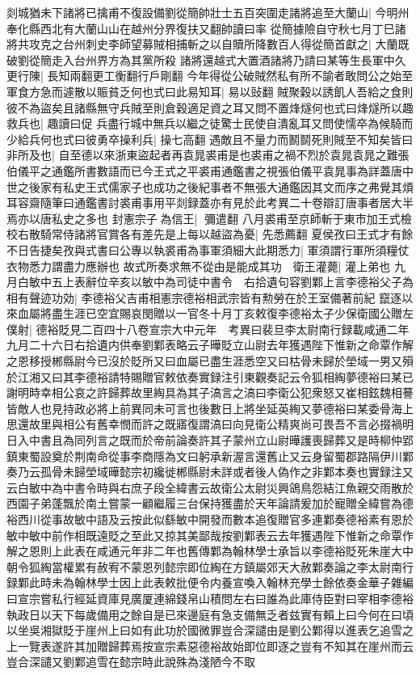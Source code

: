 剡城猶未下諸將已擒甫不復設備劉從簡帥壯士五百突圍走諸將追至大蘭山|{
	今明州奉化縣西北有大蘭山山在越州分界復扶又翻帥讀曰率}
從簡據險自守秋七月丁巳諸將共攻克之台州刺史李師望募賊相捕斬之以自贖所降數百人得從簡首獻之|{
	大蘭既破劉從簡走入台州界方為其黨所殺}
諸將還越式大置酒諸將乃請曰某等生長軍中久更行陳|{
	長知兩翻更工衡翻行戶剛翻}
今年得從公破賊然私有所不諭者敢問公之始至軍食方急而遽散以賑貧乏何也式曰此易知耳|{
	易以䜴翻}
賊聚穀以誘飢人吾給之食則彼不為盜矣且諸縣無守兵賊至則倉穀適足資之耳又問不置烽燧何也式曰烽燧所以趣救兵也|{
	趣讀曰促}
兵盡行城中無兵以繼之徒驚士民使自潰亂耳又問使懦卒為候騎而少給兵何也式曰彼勇卒操利兵|{
	操七高翻}
遇敵且不量力而鬭鬬死則賊至不知矣皆曰非所及也|{
	自至德以來浙東盜起者再袁晁裘甫是也裘甫之禍不烈於袁晁袁晁之難張伯儀平之通鑑所書數語而已今王式之平裘甫通鑑書之視張伯儀平袁晁事為詳蓋唐中世之後家有私史王式儒家子也成功之後紀事者不無張大通鑑因其文而序之弗覺其煩耳容齋隨筆曰通鑑書討裘甫事用平剡録蓋亦有見於此考異二十卷辯訂唐事者居大半焉亦以唐私史之多也}
封憲宗子為信王|{
	彌遣翻}
八月裘甫至京師斬于東市加王式檢校右散騎常侍諸將官賞各有差先是上每以越盜為憂|{
	先悉薦翻}
夏侯孜曰王式才有餘不日告捷矣孜與式書曰公專以執裘甫為事軍須細大此期悉力|{
	軍須謂行軍所須糧仗衣物悉力謂盡力應辦也}
故式所奏求無不從由是能成其功　衛王灌薨|{
	灌上弟也}
九月白敏中五上表辭位辛亥以敏中為司徒中書令　右拾遺句容劉鄴上言李德裕父子為相有聲迹功効|{
	李德裕父吉甫相憲宗德裕相武宗皆有勲勞在於王室備著前紀}
竄逐以來血屬將盡生涯已空宜賜哀閔贈以一官冬十月丁亥敕復李德裕太子少保衛國公贈左僕射|{
	德裕貶見二百四十八卷宣宗大中元年　考異曰裴旦李太尉南行録載咸通二年九月二十六日右拾遺内供奉劉鄴表略云子曄貶立山尉去年獲遇陛下惟新之命覃作解之恩移授郴縣尉今已沒於貶所又曰血屬已盡生涯悉空又曰枯骨未歸於塋域一男又殞於江湘又曰其李德裕請特賜贈官敕依奏實録注引東觀奏記云令狐相綯夢德裕曰某已謝明時幸相公哀之許歸葬故里綯具為其子滈言之滈曰李衛公犯衆怒又崔相鉉魏相謩皆敵人也見持政必將上前異同未可言也後數日上將坐延英綯又夢德裕曰某委骨海上思還故里與相公有舊幸憫而許之既寤復謂滈曰向見衛公精爽尚可畏吾不言必掇禍明日入中書且為同列言之既而於帝前論奏許其子蒙州立山尉曄護喪歸葬又是時柳仲郢鎮東蜀設奠於荆南命從事李商隱為文曰躬承新渥言還舊止又云身留蜀郡路隔伊川鄴奏乃云孤骨未歸塋域曄懿宗初纔徙郴縣尉未詳或者後人偽作之非鄴本奏也實録注又云白敏中為中書令時與右庶子段全緯書云故衛公太尉災興鴿鳥怨結江魚親交雨散於西園子弟蓬飄於南土嘗蒙一顧繼履三台保持獲盡於天年論請爰加於寵贈全緯嘗為德裕西川從事故敏中語及云按此似繇敏中開發而數本追復贈官多連鄴奏德裕素有恩於敏中敏中前作相既遠貶之至此又掠其美鄙哉按劉鄴表云去年獲遇陛下惟新之命覃作解之恩則上此表在咸通元年非二年也舊傳鄴為翰林學士承旨以李德裕貶死朱崖大中朝令狐綯當權累有赦宥不蒙恩列懿宗即位綯在方鎮屬郊天大赦鄴奏論之李太尉南行録鄴此時未為翰林學士因上此表敕批便令内養宣喚入翰林充學士餘依奏金華子雜編曰宣宗嘗私行經延資庫見廣厦連綿錢帛山積問左右曰誰為此庫侍臣對曰宰相李德裕執政日以天下每歲備用之餘自是已來邊庭有急支備無乏者兹實有賴上曰今何在曰頃以坐吳湘獄貶于崖州上曰如有此功於國微罪豈合深譴由是劉公鄴得以進表乞追雪之上一覽表遂許其加贈歸葬焉按宣宗素惡德裕故始即位即逐之豈有不知其在崖州而云豈合深譴又劉鄴追雪在懿宗時此說殊為淺陋今不取}
